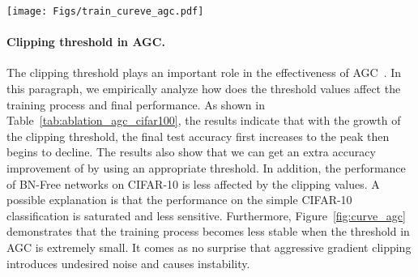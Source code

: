 \documentclass[final]{cvpr}
\begin{document}
\begin{figure*}[t]
    \centering
    \texttt{[image: Figs/train\_cureve\_agc.pdf]}
    \caption{Results of testing accuracy curves of different clipping values in AGC on CIFAR-10/100 with ReActNet-18/A. The \textcolor{green}{green} background represents the first training step, where only activations are binarized. In the \textcolor{orange}{orange} part, both activations and weights are binary. }
    \label{fig:curve_agc}
\end{figure*}

\paragraph{Clipping threshold in AGC.} \label{sec:agc} The clipping threshold  plays an important role in the effectiveness of AGC~\cite{brock2021agc}. In this paragraph, we empirically analyze how does the threshold values affect the training process and final performance. As shown in Table~\ref{tab:ablation_agc_cifar100}, the results indicate that with the growth of the clipping threshold, the final test accuracy first increases to the peak then begins to decline. The results also show that we can get an extra accuracy improvement of  by using an appropriate threshold. In addition, the performance of BN-Free networks on CIFAR-10 is less affected by the clipping values. A possible explanation is that the performance on the simple CIFAR-10 classification is saturated and less sensitive. Furthermore, Figure~\ref{fig:curve_agc} demonstrates that the training process becomes less stable when the threshold in AGC is extremely small. It comes as no surprise that aggressive gradient clipping introduces undesired noise and causes instability.
\end{document}
